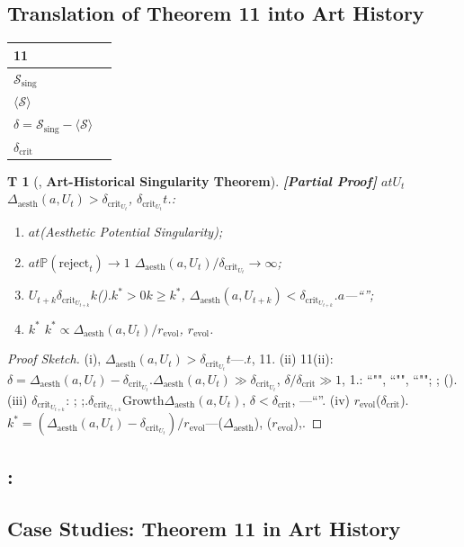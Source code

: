 \documentclass[12pt,a4paper]{article}
\newtheorem{theorem}Theorem[section]
\theoremstyle{remark}
\newcommand{\Pbb}{\mathbb{P}}
\newcommand{\Sstates}{\mathcal{S}}
\newcommand{\avg}[1]{\langle #1 \rangle}
\newcommand{\AesthDelta}{\Delta_{\text{aesth}}}
\newcommand{\CritDelta}{\delta_{\text{crit}}}
\newcommand{\rigorPartial}{\textnormal{\textbf{[Partial Proof]}}}
\begin{document}
\subsection{Translation of Theorem 11 into Art History}
\begin{center}
\begin{tabular}{@{}ll@{}}
\toprule
\textbf{11} &  \\
\midrule
 $\Sstates_{\text{sing}}$ & \\
 $\avg{\Sstates}$ & \\
 $\delta = \Sstates_{\text{sing}} - \avg{\Sstates}$ & \\
 $\delta_{\text{crit}}$ & \\
\bottomrule
\end{tabular}
\end{center}
\begin{theorem}[, \textbf{Art-Historical Singularity Theorem}]\label{thm:art_singularity}\rigorPartial
$a$$t$$U_t$$\AesthDelta(a, U_t) > \CritDelta_{U_t}$, $\CritDelta_{U_t}$$t$.: 
\begin{enumerate}[label=(\roman*)]
 \item $a$$t$(Aesthetic Potential Singularity); 
 \item $a$$t$$\Pbb(\text{reject}_t) \to 1$ $\AesthDelta(a, U_t) / \CritDelta_{U_t} \to \infty$; 
 \item $U_{t+k}$$\CritDelta_{U_{t+k}}$$k$().$k^* > 0$$k \geq k^*$, $\AesthDelta(a, U_{t+k}) < \CritDelta_{U_{t+k}}$.$a$---``''; 
 \item $k^*$ $k^* \propto \AesthDelta(a, U_t) / r_{\text{evol}}$, $r_{\text{evol}}$.
\end{enumerate}
\end{theorem}
\begin{proof}[Proof Sketch]
(i), $\AesthDelta(a, U_t) > \CritDelta_{U_t}$$t$---.$t$, 11.
(ii) 11(ii): $\delta = \AesthDelta(a, U_t) - \CritDelta_{U_t}$.$\AesthDelta(a, U_t) \gg \CritDelta_{U_t}$, $\delta / \delta_{\text{crit}} \gg 1$, 1.: ``"", ``"", ``""; ; ().
(iii) $\CritDelta_{U_{t+k}}$: ; ;.$\CritDelta_{U_{t+k}}$Growth$\AesthDelta(a, U_t)$, $\delta < \delta_{\text{crit}}$, ---``''.
(iv) $r_{\text{evol}}$($\CritDelta$).$k^* = (\AesthDelta(a, U_t) - \CritDelta_{U_t}) / r_{\text{evol}}$---($\AesthDelta$), ($r_{\text{evol}}$),.
\end{proof}
\subsection{:}
\subsection{Case Studies: Theorem 11 in Art History}
\end{document}

